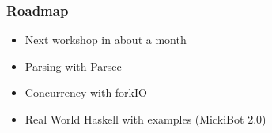 \documentclass{beamer}
\begin{document}
\begin{frame}[fragile]
\frametitle{Roadmap}

\begin{itemize}
\item Next workshop in about a month
\item Parsing with Parsec
\item Concurrency with forkIO
\item Real World Haskell with examples (MickiBot 2.0)
\end{itemize}
\end{frame}
\end{document}
